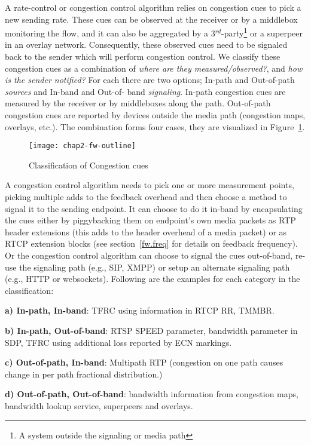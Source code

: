 A rate-control or congestion control algorithm relies on congestion cues to
pick a new sending rate. These cues can be observed at the receiver or by a
middlebox monitoring the flow, and it can also be aggregated by a
3$^{rd}$-party\footnote{A system outside the signaling or media path} or a
superpeer in an overlay network. Consequently, these observed cues need to be
signaled back to the sender which will perform congestion control. We classify
these congestion cues as a combination of \emph{where are they
measured/observed?}, and \emph{how is the sender notified?} For each there are
two options; In-path and Out-of-path \emph{sources} and In-band and Out-of-%
band \emph{signaling}. In-path congestion cues are measured by the receiver or
by middleboxes along the path. Out-of-path congestion cues are reported by
devices outside the media path (congestion maps, overlays, etc.). The
combination forms four cases, they are visualized in Figure~\ref{fig:4:fw}.

\begin{figure}[!h]
\texttt{[image: chap2-fw-outline]}
\caption{Classification of Congestion cues}
\label{fig:4:fw}
\end{figure}

A congestion control algorithm needs to pick one or more measurement points,
picking multiple adds to the feedback overhead and then choose a method to
signal it to the sending endpoint. It can choose to do it in-band by
encapsulating the cues either by piggybacking them on endpoint's own media
packets as RTP header extensions (this adds to the header overhead of a media
packet) or as RTCP extension blocks (see section~\ref{fw.freq} for details on
feedback frequency). Or the congestion control algorithm can choose to signal
the cues out-of-band, re-use the signaling path (e.g., SIP, XMPP) or setup an
alternate signaling path (e.g., HTTP or websockets). Following are the
examples for each category in the classification:

\textbf{a) In-path, In-band}: TFRC using information in RTCP RR, TMMBR.

\textbf{b) In-path, Out-of-band}: RTSP SPEED parameter, bandwidth parameter in
SDP, TFRC using additional loss reported by ECN markings.

\textbf{c) Out-of-path, In-band}: Multipath RTP (congestion on one path causes
change in per path fractional distribution.)

\textbf{d) Out-of-path, Out-of-band}: bandwidth information from congestion
maps, bandwidth lookup service, superpeers and overlays.

